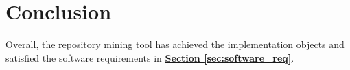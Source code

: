 \documentclass[12pt, a4paper]{report}
\begin{document}
\chapter{Conclusion}
Overall, the repository mining tool has achieved the implementation objects and satisfied the
software requirements in \hyperref[sec:software_req]{\textbf{Section \ref*{sec:software_req}}}.

\printglossary[type=\acronymtype]
\printbibliography[heading=bibintoc]


\end{document}
